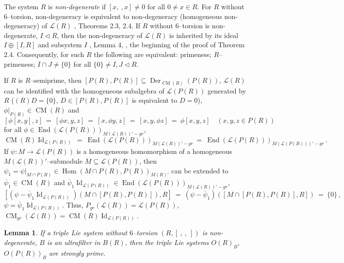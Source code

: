 \documentclass[a4paper,11pt]{article}
\newtheorem{lemma}[defi]{Lemma}
\DeclareMathOperator{\Id}{Id}
\DeclareMathOperator{\Hom}{Hom}
\DeclareMathOperator{\End}{End}
\DeclareMathOperator{\Der}{Der}
\DeclareMathOperator{\CM}{CM}
\begin{document}
The system $R$ is \emph{non-degenerate} if ${[x,\ , x]\ne 0}$ for all 
${0\ne x\in R}$. For $R$ without $6$--torsion, non-degeneracy is equivalent to 
non-degeneracy (homogeneous non-degeneracy) of $\mathcal{L}(R)$ 
\cite{NLS}, Theorems 2.3, 2.4. If $R$ without $6$--torsion is 
non-degenerate, ${I\lhd R}$, then the non-degeneracy of $\mathcal{L}(R)$ is 
inherited by its ideal ${I\oplus [I, R]}$ and subsystem $I$ 
\cite{Zel}, Lemma 4, \cite{NLS}, the beginning of the proof of Theorem 2.4. 
Consequently, for such $R$ the following are equivalent: primeness; 
$R$--primeness; ${I\cap J\ne \{0\}}$ for all ${\{0\}\ne I, J\lhd R}$. 

If $R$ is $R$--semiprime, then ${[P(R), P(R)]\subseteq \Der_{\CM(R)}(P(R))}$, 
$\mathcal{L}(R)$ can be identified with the homogeneous subalgebra of 
$\mathcal{L}(P(R))$ generated by $R$ (${(R)D=\{0\}}$, ${D\in [P(R), P(R)]}$
is equivalent to ${D=0}$), ${\phi|_{P(R)}\in \CM(R)}$ and
\[
[\phi [x, y], z]\ =\ [\phi x, y, z]\ =\ [x, \phi y, z]\ =\ 
[x, y, \phi z]\ =\ \phi [x, y, z]\quad (x, y, z\in P(R))
\]
for all ${\phi\in \End(\mathcal{L}(P(R)))_{M(\mathcal{L}(R))'-gr}}$, 
\[
\CM(R) \Id_{\mathcal{L}(P(R))}\ =\ 
\End(\mathcal{L}(P(R)))_{M(\mathcal{L}(R))'-gr}\ =\ 
\End(\mathcal{L}(P(R)))_{M(\mathcal{L}(P(R)))'-gr}\,.
\]
If ${\psi: M\longrightarrow \mathcal{L}(P(R))}$ is a homogeneous homomorphism 
of a homogeneous $M(\mathcal{L}(R))'$--sub\-module 
${M\subseteq \mathcal{L}(P(R))}$, then ${\psi_1=\psi|_{M\cap P(R)}\in 
\Hom(M\cap P(R), P(R))_{M(R)'}}$ can be extended to 
${\overline{\psi}_1\in \CM(R)}$ and 
${\overline{\psi}_1 \Id_{\mathcal{L}(P(R))}\in 
\End(\mathcal{L}(P(R)))_{M(\mathcal{L}(R))'-gr}}$, 
\[
[(\psi-\overline{\psi}_1 \Id_{\mathcal{L}(P(R))})(M\cap [P(R), P(R)]), R]\ =\ 
(\psi-\overline{\psi}_1)([M\cap [P(R), P(R)], R])\ =\ \{0\}\,,
\]
${\psi=\overline{\psi}_1 \Id_{\mathcal{L}(P(R))}}$. Thus, 
${P_{gr}(\mathcal{L}(R))=\mathcal{L}(P(R))}$, 
${\CM_{gr}(\mathcal{L}(R))=\CM(R) \Id_{\mathcal{L}(P(R))}}$. 

\begin{lemma} 
If a triple Lie system without $6$--torsion ${(R, [\ ,\ ,\ ])}$ is 
non-degenerate, $B$ is an ultrafilter in $B(R)$, then the triple 
Lie systems $O(R)_B$, $O(P(R))_B$ are strongly prime.
\end{lemma}
\end{document}
